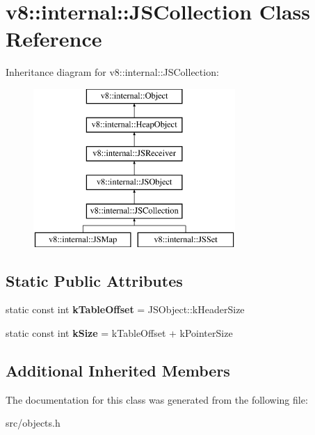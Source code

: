 \hypertarget{classv8_1_1internal_1_1_j_s_collection}{}\section{v8\+:\+:internal\+:\+:J\+S\+Collection Class Reference}
\label{classv8_1_1internal_1_1_j_s_collection}
Inheritance diagram for v8\+:\+:internal\+:\+:J\+S\+Collection\+:\begin{figure}[H]
\begin{center}
\leavevmode
\includegraphics[height=6.000000cm]{classv8_1_1internal_1_1_j_s_collection}
\end{center}
\end{figure}
\subsection*{Static Public Attributes}
\begin{DoxyCompactItemize}
\item 
\hypertarget{classv8_1_1internal_1_1_j_s_collection_a42e776075fa6d614afa44278d85f4af8}{}static const int {\bfseries k\+Table\+Offset} = J\+S\+Object\+::k\+Header\+Size\label{classv8_1_1internal_1_1_j_s_collection_a42e776075fa6d614afa44278d85f4af8}

\item 
\hypertarget{classv8_1_1internal_1_1_j_s_collection_ab6a359c87862432a69bfbc1be491ac8e}{}static const int {\bfseries k\+Size} = k\+Table\+Offset + k\+Pointer\+Size\label{classv8_1_1internal_1_1_j_s_collection_ab6a359c87862432a69bfbc1be491ac8e}

\end{DoxyCompactItemize}
\subsection*{Additional Inherited Members}


The documentation for this class was generated from the following file\+:\begin{DoxyCompactItemize}
\item 
src/objects.\+h\end{DoxyCompactItemize}
